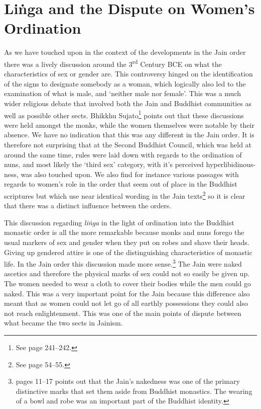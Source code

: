 \section{Liṅga and the Dispute on Women's Ordination}
\label{linga}

As we have touched upon in the context of the developments in the Jain order there was a lively discussion around the 3\textsuperscript{rd} Century BCE on what the characteristics of sex or gender are. This controversy hinged on the identification of the signs to designate somebody as a woman, which logically also led to the examination of what is male, and `neither male nor female'. This was a much wider religious debate that involved both the Jain and Buddhist communities as well as possible other sects. Bhikkhu Sujato\footnote{See \cite{sujato2009} page 241–242.} points out that these discussions were held amongst the monks, while the women themselves were notable by their absence. We have no indication that this was any different in the Jain order. It is therefore not surprising that at the Second Buddhist Council, which was held at around the same time, rules were laid down with regards to the ordination of nuns, and most likely the `third sex' category, with it's perceived hyperlibidinous-ness, was also touched upon. We also find for instance various passages with regards to women's role in the order that seem out of place in the Buddhist scriptures but which use near identical wording in the Jain texts\footnote{See \cite{sujato2009} page 54–55.} so it is clear that there was a distinct influence between the orders.

This discussion regarding {\em liṅga} in the light of ordination into the Buddhist monastic order is all the more remarkable because monks and nuns forego the usual markers of sex and gender when they put on robes and shave their heads. Giving up gendered attire is one of the distinguishing characteristics of monastic life. In the Jain order this discussion made more sense.\footnote{\cite{maes2016} pages 11–17 points out that the Jain's nakedness was one of the primary distinctive marks that set them aside from Buddhist monastics. The wearing of a bowl and robe was an important part of the Buddhist identity.} The Jain were naked ascetics and therefore the physical marks of sex could not so easily be given up. The women needed to wear a cloth to cover their bodies while the men could go naked. This was a very important point for the Jain because this difference also meant that as women could not let go of all earthly possessions they could also not reach enlightenment. This was one of the main points of dispute between what became the two sects in Jainism.

